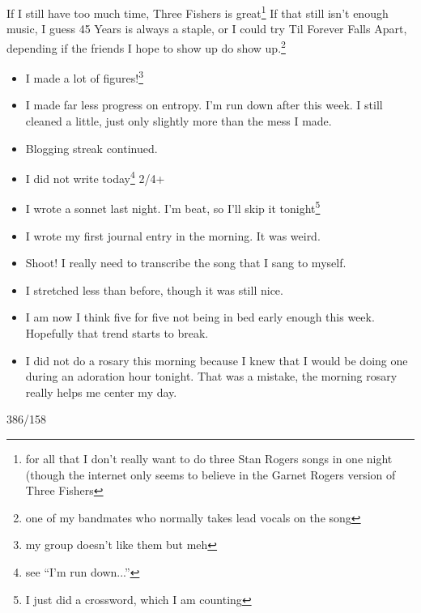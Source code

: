 \documentclass[12pt]{article}[titlepage]
\newcommand{\say}[1]{``#1''}
\newcommand{\1}{\={a}}
\newcommand{\2}{\={e}}
\newcommand{\3}{\={\i}}
\newcommand{\4}{\=o}
\newcommand{\5}{\=u}
\newcommand{\6}{\={A}}
\renewcommand{\,}{\textsuperscript{,}}
\begin{document}
If I still have too much time, Three Fishers is great\footnote{for all that I don't really want to do three Stan Rogers songs in one night (though the internet only seems to believe in the Garnet Rogers version of Three Fishers}
If that still isn't enough music, I guess 45 Years is always a staple, or I could try Til Forever Falls Apart, depending if the friends I hope to show up do show up.\footnote{one of my bandmates who normally takes lead vocals on the song}

\begin{itemize}
\item I made a lot of figures!\footnote{my group doesn't like them but meh}
\item I made far less progress on entropy. I'm run down after this week. I still cleaned a little, just only slightly more than the mess I made.
\item Blogging streak continued.
\item I did not write today\footnote{see \say{I'm run down...}} 2/4+
\item I wrote a sonnet last night. I'm beat, so I'll skip it tonight\footnote{I just did a crossword, which I am counting}
\item I wrote my first journal entry in the morning. It was weird.
\item Shoot! I really need to transcribe the song that I sang to myself.
\item I stretched less than before, though it was still nice.
\item I am now I think five for five not being in bed early enough this week.
Hopefully that trend starts to break.
\item I did not do a rosary this morning because I knew that I would be doing one during an adoration hour tonight. That was a mistake, the morning rosary really helps me center my day.
\end{itemize}

386/158	
\end{document}

